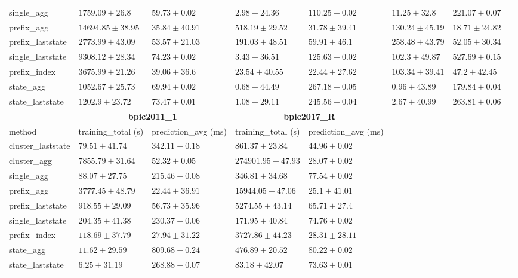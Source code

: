\documentclass[twoside,11pt]{Latex/Classes/PhDthesisPSnPDF}
\begin{document}
\begin{table}[h]
{\begin{tabular}{llllllll}
			single\_agg & $1759.09 \pm 26.8$ & $59.73 \pm 0.02$ & $2.98 \pm 24.36$ & $110.25 \pm 0.02$ & $11.25 \pm 32.8$ & $221.07 \pm 0.07$ \\ 
			prefix\_agg & $14694.85 \pm 38.95$ & $35.84 \pm 40.91$ & $518.19 \pm 29.52$ & $31.78 \pm 39.41$ & $130.24 \pm 45.19$ & $\mathbf{18.71 \pm 24.82}$ \\ 
			prefix\_laststate & $2773.99 \pm 43.09$ & $53.57 \pm 21.03$ & $191.03 \pm 48.51$ & $59.91 \pm 46.1$ & $258.48 \pm 43.79$ & $52.05 \pm 30.34$ \\ 
			single\_laststate & $9308.12 \pm 28.34$ & $74.23 \pm 0.02$ & $3.43 \pm 36.51$ & $125.63 \pm 0.02$ & $102.3 \pm 49.87$ & $527.69 \pm 0.15$ \\ 
			prefix\_index & $3675.99 \pm 21.26$ & $39.06 \pm 36.6$ & $23.54 \pm 40.55$ & $\mathbf{22.44 \pm 27.62}$ & $103.34 \pm 39.41$ & $47.2 \pm 42.45$ \\ 
			state\_agg & $\mathbf{1052.67 \pm 25.73}$ & $69.94 \pm 0.02$ & $\mathbf{0.68 \pm 44.49}$ & $267.18 \pm 0.05$ & $\mathbf{0.96 \pm 43.89}$ & $179.84 \pm 0.04$ \\ 
			state\_laststate & $1202.9 \pm 23.72$ & $73.47 \pm 0.01$ & $1.08 \pm 29.11$ & $245.56 \pm 0.04$ & $2.67 \pm 40.99$ & $263.81 \pm 0.06$ \\ 
			\bottomrule
			\toprule
			& \multicolumn{2}{c}{{\bfseries bpic2011\_1}} & \multicolumn{2}{c}{{\bfseries bpic2017\_R}} \\ \cmidrule(lr){2-3} \cmidrule(lr){4-5} \cmidrule(lr){6-7}
			method  & training\_total (s) & prediction\_avg (ms) & training\_total (s) & prediction\_avg (ms) \\ \midrule
			cluster\_laststate & $79.51 \pm 41.74$ & $342.11 \pm 0.18$ & $861.37 \pm 23.84$ & $44.96 \pm 0.02$ \\ 
			cluster\_agg & $7855.79 \pm 31.64$ & $52.32 \pm 0.05$ & $274901.95 \pm 47.93$ & $28.07 \pm 0.02$ \\ 
			single\_agg & $88.07 \pm 27.75$ & $215.46 \pm 0.08$ & $346.81 \pm 34.68$ & $77.54 \pm 0.02$ \\ 
			prefix\_agg & $3777.45 \pm 48.79$ & $\mathbf{22.44 \pm 36.91}$ & $15944.05 \pm 47.06$ & $\mathbf{25.1 \pm 41.01}$ \\ 
			prefix\_laststate & $918.55 \pm 29.09$ & $56.73 \pm 35.96$ & $5274.55 \pm 43.14$ & $65.71 \pm 27.4$ \\ 
			single\_laststate & $204.35 \pm 41.38$ & $230.37 \pm 0.06$ & $171.95 \pm 40.84$ & $74.76 \pm 0.02$ \\ 
			prefix\_index & $118.69 \pm 37.79$ & $27.94 \pm 31.22$ & $3727.86 \pm 44.23$ & $28.31 \pm 28.11$ \\ 
			state\_agg & $11.62 \pm 29.59$ & $809.68 \pm 0.24$ & $476.89 \pm 20.52$ & $80.22 \pm 0.02$ \\ 
			state\_laststate & $\mathbf{6.25 \pm 31.19}$ & $268.88 \pm 0.07$ & $\mathbf{83.18 \pm 42.07}$ & $73.63 \pm 0.01$ \\ 
			\bottomrule
			
			
		\end{tabular}%
	}
\end{table}
\end{document}
